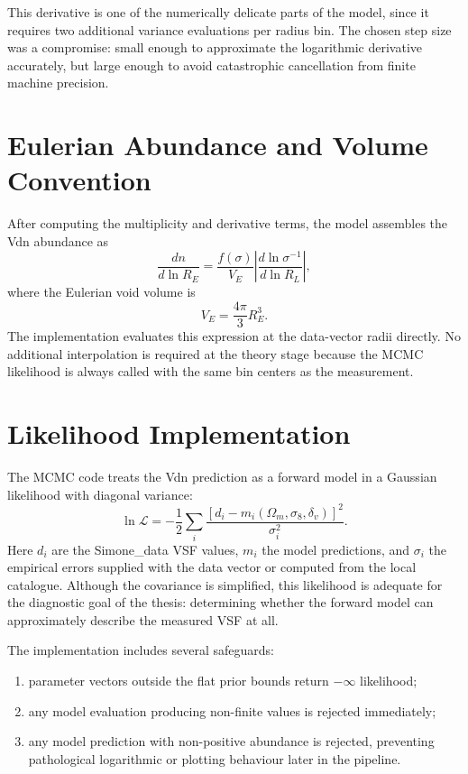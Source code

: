 \documentclass[12pt]{report}
\begin{document}
This derivative is one of the numerically delicate parts of the model, since it requires two additional variance evaluations per radius bin. The chosen step size was a compromise: small enough to approximate the logarithmic derivative accurately, but large enough to avoid catastrophic cancellation from finite machine precision.

\section{Eulerian Abundance and Volume Convention}

After computing the multiplicity and derivative terms, the model assembles the Vdn abundance as
\begin{equation}
    \frac{dn}{d\ln R_E}
    =
    \frac{f(\sigma)}{V_E}
    \left|\frac{d\ln\sigma^{-1}}{d\ln R_L}\right|,
\end{equation}
where the Eulerian void volume is
\begin{equation}
    V_E = \frac{4\pi}{3}R_E^3.
\end{equation}
The implementation evaluates this expression at the data-vector radii directly. No additional interpolation is required at the theory stage because the MCMC likelihood is always called with the same bin centers as the measurement.

\section{Likelihood Implementation}

The MCMC code treats the Vdn prediction as a forward model in a Gaussian likelihood with diagonal variance:
\begin{equation}
    \ln \mathcal{L}
    =
    -\frac{1}{2}\sum_i
    \frac{[d_i - m_i(\Omega_m,\sigma_8,\delta_v)]^2}{\sigma_i^2}.
\end{equation}
Here $d_i$ are the Simone\_data VSF values, $m_i$ the model predictions, and $\sigma_i$ the empirical errors supplied with the data vector or computed from the local catalogue. Although the covariance is simplified, this likelihood is adequate for the diagnostic goal of the thesis: determining whether the forward model can approximately describe the measured VSF at all.

The implementation includes several safeguards:
\begin{enumerate}
    \item parameter vectors outside the flat prior bounds return $-\infty$ likelihood;
    \item any model evaluation producing non-finite values is rejected immediately;
    \item any model prediction with non-positive abundance is rejected, preventing pathological logarithmic or plotting behaviour later in the pipeline.
\end{enumerate}
\end{document}
